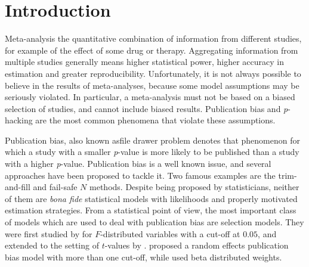 \documentclass{article}
\theoremstyle{plain}
\theoremstyle{definition}
\begin{document}



\section{Introduction}

Meta-analysis the quantitative combination of information from different studies, for example of the effect of some drug or therapy. Aggregating information from multiple studies generally means higher statistical power, higher accuracy in estimation and greater reproducibility. Unfortunately, it is not always possible to believe in the results of meta-analyses, because some model assumptions may be seriously violated. In particular, a meta-analysis must not be based on a biased selection of studies, and cannot include biased results. Publication bias \citep{sterling1959publication} and \textit{p}-hacking \citep{simmons2011false} are the most common phenomena that violate these assumptions. 

Publication bias, also known asfile drawer problem \citep[see, e.g.,][]{iyengar1988selection} denotes that phenomenon for which a study with a smaller \textit{p}-value is more likely to be published than a study with a higher \textit{p}-value. Publication bias is a well known issue, and several approaches have been proposed to tackle it. Two famous examples are the trim-and-fill \citep{duval2000trim} and fail-safe $N$ \citep{becker2005failsafe} methods. Despite being proposed by statisticians, neither of them are \textit{bona fide} statistical models with likelihoods and properly motivated estimation strategies. From a statistical point of view, the most important class of models which are used to deal with publication bias are selection models. They were first studied by \citet{hedges1984estimation} for $F$-distributed variables with a cut-off at $0.05$, and extended to the setting of $t$-values by \citet{iyengar1988selection}. \citet{hedges1992modeling} proposed a random effects publication bias model with more than one cut-off, while \citet{citkowicz2017parsimonious} used beta distributed weights.
\end{document}
